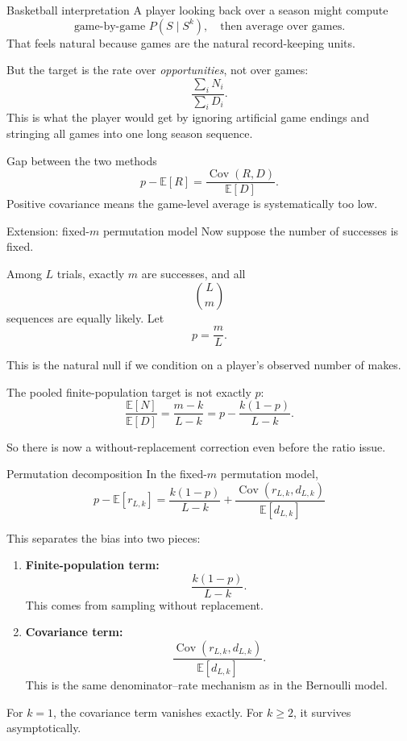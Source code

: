 \documentclass[aspectratio=169,professionalfonts]{beamer}
\newcommand{\E}{\mathbb{E}}
\newcommand{\Cov}{\operatorname{Cov}}
\begin{document}
\begin{frame}{Basketball interpretation}
\small
A player looking back over a season might compute
\[
  \text{game-by-game } P(S\mid S^k),
  \quad \text{then average over games.}
\]
That feels natural because games are the natural record-keeping units.

\vspace{0.15cm}
But the target is the rate over \emph{opportunities}, not over games:
\[
  \frac{\sum_i N_i}{\sum_i D_i}.
\]
This is what the player would get by ignoring artificial game endings and stringing all games into one long season sequence.

\vspace{0.15cm}
\begin{block}{Gap between the two methods}
\[
  p-\E[R]
  =
  \frac{\Cov(R,D)}{\E[D]}.
\]
Positive covariance means the game-level average is systematically too low.
\end{block}
\end{frame}

\begin{frame}{Extension: fixed-$m$ permutation model}
Now suppose the number of successes is fixed.

\vspace{0.2cm}
Among $L$ trials, exactly $m$ are successes, and all
\[
  \binom{L}{m}
\]
sequences are equally likely. Let
\[
  p=\frac{m}{L}.
\]

\vspace{0.25cm}
This is the natural null if we condition on a player's observed number of makes.

\vspace{0.3cm}
The pooled finite-population target is not exactly $p$:
\[
  \frac{\E[N]}{\E[D]}
  =
  \frac{m-k}{L-k}
  =
  p-\frac{k(1-p)}{L-k}.
\]

\vspace{0.15cm}
So there is now a without-replacement correction even before the ratio issue.
\end{frame}

\begin{frame}{Permutation decomposition}
In the fixed-$m$ permutation model,
\[
\boxed{
  p-\E[r_{L,k}]
  =
  \frac{k(1-p)}{L-k}
  +
  \frac{\Cov(r_{L,k},d_{L,k})}{\E[d_{L,k}]}
}
\]

\vspace{0.2cm}
This separates the bias into two pieces:
\begin{enumerate}
  \item \textbf{Finite-population term:}
  \[
    \frac{k(1-p)}{L-k}.
  \]
  This comes from sampling without replacement.

  \item \textbf{Covariance term:}
  \[
    \frac{\Cov(r_{L,k},d_{L,k})}{\E[d_{L,k}]}.
  \]
  This is the same denominator--rate mechanism as in the Bernoulli model.
\end{enumerate}

\vspace{0.1cm}
For $k=1$, the covariance term vanishes exactly. For $k\ge 2$, it survives asymptotically.
\end{frame}
\end{document}
